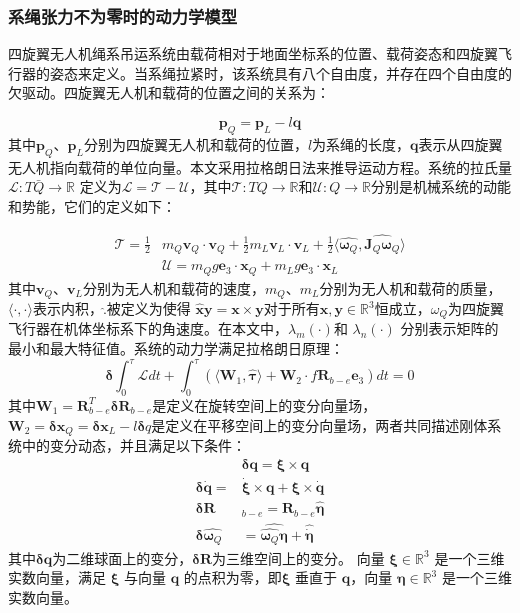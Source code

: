 \documentclass[lang=chs, degree=master, blindreview=false, winfonts=true]{yanputhesis}
\begin{document}
\subsubsection{系绳张力不为零时的动力学模型}

四旋翼无人机绳系吊运系统由载荷相对于地面坐标系的位置、载荷姿态和四旋翼飞行器的姿态来定义。当系绳拉紧时，该系统具有八个自由度，并存在四个自由度的欠驱动。四旋翼无人机和载荷的位置之间的关系为：

\begin{equation}
	\bm p_Q=\bm p_L-l\bm q
\end{equation}
其中$\bm p_Q$、$\bm p_L$分别为四旋翼无人机和载荷的位置，$l$为系绳的长度，$\bm q$表示从四旋翼无人机指向载荷的单位向量。本文采用拉格朗日法来推导运动方程。系统的拉氏量 $\mathcal{L}:T\bar{Q}\to\mathbb{R}$ 定义为$\mathcal{L}=\mathcal{T}-\mathcal{U}$，其中$\mathcal{T}:TQ\to\mathbb{R}$和${\mathcal{U}}:Q\to\mathbb{R}$分别是机械系统的动能和势能，它们的定义如下：

\begin{equation}
\begin{aligned}
	\mathcal{T}=\frac{1}{2}&m_{Q}\bm v_{Q}\cdot \bm v_{Q}+\frac{1}{2}m_{L}\bm v_{L}\cdot \bm v_{L}+\frac{1}{2}\langle\hat{\bm  \omega_Q},\widehat{\bm J_{Q}\bm  \omega_Q}\rangle\\
	&\mathcal{U}=m_{Q}g\bm e_{3}\cdot \bm x_{Q}+m_{L}g\bm e_{3}\cdot \bm x_{L}
\end{aligned}
	\label{2-8}
\end{equation}
其中$\bm v_Q$、$\bm v_L$分别为无人机和载荷的速度，$m_Q$、$m_L$分别为无人机和载荷的质量，$\langle\cdot,\cdot\rangle $表示内积，$\hat{.}$被定义为使得 $\hat{\bm x}\bm y=\bm x\times \bm y$对于所有$\bm x,\bm y\in\mathbb{R}^3$恒成立，$\omega_Q$为四旋翼飞行器在机体坐标系下的角速度。在本文中，$\lambda_m(\cdot)$和 $\lambda_n(\cdot)$ 分别表示矩阵的最小和最大特征值。系统的动力学满足拉格朗日原理：
\begin{equation}
	\bm \delta\int_0^\tau\mathcal{L} dt+\int_0^\tau\left(\langle \bm W_1,\hat{\bm \tau}\rangle+\bm W_2\cdot f\bm{R}_{b-e}\bm e_3\right) dt=0
	\label{2-10}
\end{equation}
其中$\bm W_{1}=\bm R_{b-e}^{T}\bm \delta \bm R_{b-e}$是定义在旋转空间上的变分向量场， $ \bm W_{2}=\bm \delta \bm x_{Q}=\bm \delta \bm x_{L}-l\bm \delta q$是定义在平移空间上的变分向量场，两者共同描述刚体系统中的变分动态，并且满足以下条件：
\begin{equation}
	\begin{aligned}
	&\bm \delta \bm q = \bm \xi \times \bm q\\
	\bm \delta \dot{\bm q} = &\dot{\bm \xi} \times \bm q + \bm \xi \times \dot{\bm q} \\
	\bm \delta\bm  R&_{b-e} = \bm R_{b-e} \hat{\bm \eta} \\
	\bm \delta \hat{\bm  \omega _Q}& = \widehat{\hat{\bm  \omega_Q} \bm \eta} + \hat{\dot{\bm \eta}}
\end{aligned}
\end{equation}
其中$\bm \delta \bm q$为二维球面上的变分，$\bm \delta \bm R$为三维空间上的变分。
向量 $\bm{\xi} \in \mathbb{R}^3$ 是一个三维实数向量，满足 $\bm{\xi}$ 与向量 $\bm{q}$ 的点积为零，即$\bm{\xi}$ 垂直于 $\bm{q}$，向量 $\bm{\eta} \in \mathbb{R}^3$ 是一个三维实数向量。
\end{document}
